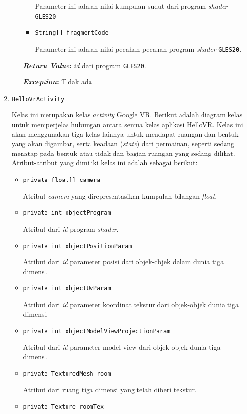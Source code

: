 \begin{enumerate}
\begin{itemize}
\begin{itemize}
			Parameter ini adalah nilai kumpulan sudut dari program \textit{shader} \texttt{GLES20}	
			\item \texttt{String[] fragmentCode}
			
			Parameter ini adalah nilai pecahan-pecahan program \textit{shader} \texttt{GLES20}.		
		\end{itemize}
		\textbf{\textit{Return Value}:} \textit{id} dari program \texttt{GLES20}.
			
		\textbf{\textit{Exception}:} Tidak ada
	\end{itemize}
	
	
	\item \texttt{HelloVrActivity}
	
	Kelas ini merupakan kelas {\it activity} Google VR. Berikut adalah diagram kelas untuk memperjelas hubungan antara semua kelas aplikasi HelloVR. Kelas ini akan menggunakan tiga kelas lainnya untuk mendapat ruangan dan bentuk yang akan digambar, serta keadaan ({\it state}) dari permainan, seperti sedang menatap pada bentuk atau tidak dan bagian ruangan yang sedang dilihat. Atribut-atribut yang dimiliki kelas ini adalah sebagai berikut:

	\begin{itemize}
  		\item \texttt{private float[] camera}
  		
  		Atribut \textit{camera} yang direpresentasikan kumpulan bilangan \textit{float}.
  		\item \texttt{private int objectProgram}
  		
  		Atribut dari \textit{id} program \textit{shader}.
  		\item \texttt{private int objectPositionParam}
  		
  		Atribut dari \textit{id} parameter posisi dari objek-objek dalam dunia tiga dimensi.
  		\item \texttt{private int objectUvParam}
  		
  		Atribut dari \textit{id} parameter koordinat tekstur dari objek-objek dunia tiga dimensi.
  		\item \texttt{private int objectModelViewProjectionParam}
  		
  		Atribut dari \textit{id} parameter model view dari objek-objek dunia tiga dimensi.
  		\item \texttt{private TexturedMesh room}
  		
  		Atribut dari ruang tiga dimensi yang telah diberi tekstur.
  		\item \texttt{private Texture roomTex}
  		

\end{itemize}
\end{enumerate}
